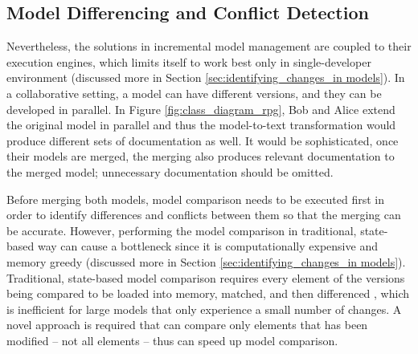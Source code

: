 \subsection{Model Differencing and Conflict Detection}
\label{sec:between_two_parallel_versions}
Nevertheless, the solutions in incremental model management are coupled to their execution engines, which limits itself to work best only in single-developer environment (discussed more in Section \ref{sec:identifying_changes_in models}). In a collaborative setting, a model can have different versions, and they can be developed in parallel. In Figure \ref{fig:class_diagram_rpg}, Bob and Alice extend the original model in parallel and thus the model-to-text transformation would produce different sets of documentation as well. It would be sophisticated, once their models are merged, the merging also produces relevant documentation to the merged model; unnecessary documentation should be omitted.   

Before merging both models, model comparison needs to be executed first in order to identify differences and conflicts between them so that the merging can be accurate. However, performing the model comparison in traditional, state-based way can cause a bottleneck since it is computationally expensive and memory greedy (discussed more in Section \ref{sec:identifying_changes_in models}). Traditional, state-based model comparison requires every element of the versions being compared to be loaded into memory, matched, and then differenced \cite{emfcompare2018developer}, which is inefficient for large models that only experience a small number of changes. A novel approach is required that can compare only elements that has been modified -- not all elements -- thus can speed up model comparison.

